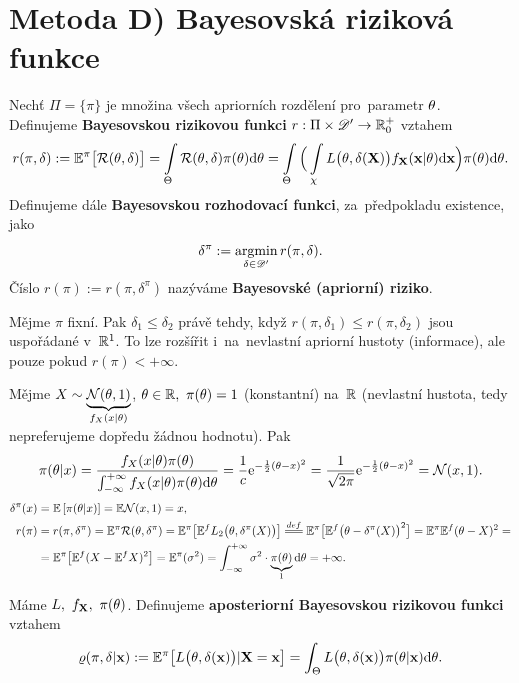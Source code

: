 \section{Metoda D) Bayesovská riziková funkce} 
\begin{define}
	Nechť $\Pi=\{ \pi\}$ je množina všech apriorních rozdělení pro~parametr $\theta$. Definujeme \textbf{Bayesovskou rizikovou funkci} $r:\Pi\times\mathscr{D}' \to\mathbb{R}_0^+$ vztahem
	$$ r(\pi,\delta):=\mathbb{E}^\pi\big[ \mathcal{R}(\theta,\delta) \big]=\int\limits_{\Theta}\mathcal{R}(\theta,\delta)\pi(\theta)\mathrm{d}\theta=\int\limits_{\Theta}\Big( \int\limits_{\chi}L\big(\theta,\delta(\textbf{X})\big)f_\textbf{X}(\textbf{x}|\theta)\mathrm{d}\textbf{x} \Big)\pi(\theta)\mathrm{d}\theta.$$
	Definujeme dále \textbf{Bayesovskou rozhodovací funkci}, za~předpokladu existence, jako $$\delta^\pi:=\mathop{\mathrm{argmin}}\limits_{\delta\in\mathscr{D}'}r(\pi,\delta).$$ 
	Číslo $r(\pi):=r(\pi,\delta^\pi)$ nazýváme \textbf{Bayesovské (apriorní) riziko}.  
	
\end{define}
\begin{remark}
	Mějme $\pi$ fixní. Pak $\delta_1\leq\delta_2$ právě tehdy, když $r(\pi,\delta_1)\leq r(\pi,\delta_2)$ jsou uspořádané v~$\mathbb{R}^1$. To lze rozšířit i~na~nevlastní apriorní hustoty (informace), ale pouze pokud $r(\pi)<+\infty$.
\end{remark}
\begin{example}
	Mějme $X\sim\underbrace{\mathcal{N}(\theta,1)}_{f_X(x|\theta)}$, $\theta\in\mathbb{R},~\pi(\theta)=1$ (konstantní) na~$\mathbb{R}$ (nevlastní hustota, tedy nepreferujeme dopředu žádnou hodnotu). Pak
	$$ \pi(\theta|x)=\frac{f_X(x|\theta) \pi(\theta)}{\int_{-\infty}^{+\infty}f_X(x|\theta) \pi(\theta)\mathrm{d}\theta}=\frac{1}{c}\mathrm{e}^{-\frac{1}{2}(\theta-x)^2}=\frac{1}{\sqrt{2\pi}}\mathrm{e}^{-\frac{1}{2}(\theta-x)^2}=\mathcal{N}(x,1).$$
	\[\begin{split}
	\delta^\pi(x)&=\EE{\pi(\t|x)}=\E\NN(x,1)=x,\\
	r(\pi)&= r(\pi,\delta^\pi)=\E^\pi \RF(\t,\delta^\pi)=\E^\pi\big[\E^f L_2\big(\t,\delta^\pi(X)\big)\big]\equal{def}\E^\pi\big[ \E^f\big(\t-\delta^\pi(X) \big)^2 \big]=\E^\pi\E^f(\t-X)^2=\\&=\E^\pi\big[ \E^f(X-\E^fX)^2 \big]=\E^\pi(\sigma^2)=\int_{-\infty}^{+\infty}\sigma^2\cdot \underbrace{\pi(\t)}_{1}\d\t=+\infty.
	\end{split}
	\]
\end{example}
\begin{define}
	Máme $L,~f_{\textbf{X}},~\pi(\theta)$. Definujeme \textbf{aposteriorní Bayesovskou rizikovou funkci} vztahem
	$$ \varrho(\pi,\delta|\textbf{x}):=\mathbb{E}^\pi\big[ L\big(\theta,\delta(\textbf{x})\big)|\textbf{X}=\textbf{x} \big]=\int_\Theta L\big(\theta,\delta(\textbf{x})\big)\pi(\theta|\textbf{x})\mathrm{d}\theta.$$ 
\end{define}

